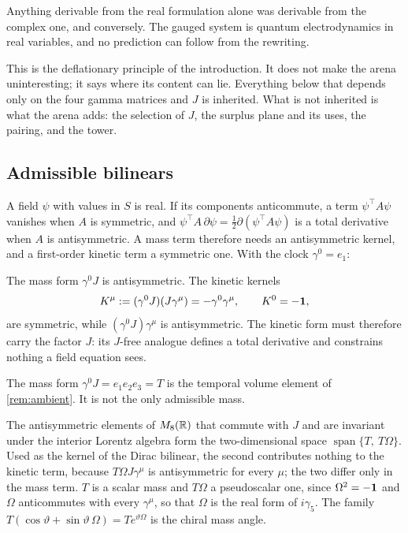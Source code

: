 \begin{corollary}
\label{cor:nopredict}
Anything derivable from the real formulation alone was derivable from the complex one, and conversely. The gauged system is quantum
electrodynamics in real variables, and no prediction can follow from the rewriting.
\end{corollary}

This is the deflationary principle of the introduction. It does not make the arena uninteresting; it says where its content can
lie. Everything below that depends only on the four gamma matrices and $J$ is inherited. What is not inherited is what the arena
adds: the selection of $J$, the surplus plane and its uses, the pairing, and the tower.

\subsection{Admissible bilinears}

A field $\psi$ with values in $S$ is real. If its components anticommute, a term $\psi^{\!\top}A\psi$ vanishes when $A$ is
symmetric, and $\psi^{\!\top}A\,\partial\psi=\tfrac12\partial(\psi^{\!\top}A\psi)$ is a total derivative when $A$ is antisymmetric. A
mass term therefore needs an antisymmetric kernel, and a first-order kinetic term a symmetric one. With the clock $\gamma^0=e_1$:

\begin{proposition}
\label{prop:kernels1}
The mass form $\gamma^0J$ is antisymmetric. The kinetic kernels
\[
K^\mu:=(\gamma^0J)(J\gamma^\mu)=-\gamma^0\gamma^\mu,\qquad K^0=-\mathbf 1,
\]
are symmetric, while $(\gamma^0J)\gamma^\mu$ is antisymmetric. The kinetic form must therefore carry the factor $J$: its $J$-free analogue
defines a total derivative and constrains nothing a field equation sees.
\end{proposition}

The mass form $\gamma^0J=e_1e_2e_3=T$ is the temporal volume element of \cref{rem:ambient}. It is not the only admissible mass.

\begin{proposition}
\label{prop:massangle}
The antisymmetric elements of $M_8(\mathbb{R})$ that commute with $J$ and are invariant under the interior Lorentz algebra form the
two-dimensional space $\operatorname{span}\{T,\ T\Omega\}$. Used as the kernel of the Dirac bilinear, the second contributes nothing
to the kinetic term, because $T\Omega J\gamma^\mu$ is antisymmetric for every $\mu$; the two differ only in the mass term. $T$ is a
scalar mass and $T\Omega$ a pseudoscalar one, since $\Omega^2=-\mathbf 1$ and $\Omega$ anticommutes with every $\gamma^\mu$, so that $\Omega$
is the real form of $i\gamma_5$. The family $T(\cos\vartheta+\sin\vartheta\,\Omega)=Te^{\vartheta\Omega}$ is the chiral mass angle.
\end{proposition}

